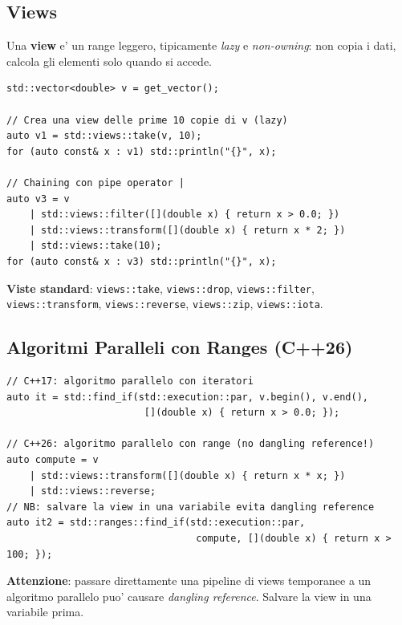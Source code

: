 \documentclass[11pt,a4paper]{article}
\theoremstyle{remark}
\begin{document}
\subsection{Views}

Una \textbf{view} e' un range leggero, tipicamente \emph{lazy} e \emph{non-owning}: non copia i dati, calcola gli elementi solo quando si accede.

\begin{lstlisting}[style=cpp]
std::vector<double> v = get_vector();

// Crea una view delle prime 10 copie di v (lazy)
auto v1 = std::views::take(v, 10);
for (auto const& x : v1) std::println("{}", x);

// Chaining con pipe operator |
auto v3 = v
    | std::views::filter([](double x) { return x > 0.0; })
    | std::views::transform([](double x) { return x * 2; })
    | std::views::take(10);
for (auto const& x : v3) std::println("{}", x);
\end{lstlisting}

\textbf{Viste standard}: \lstinline|views::take|, \lstinline|views::drop|, \lstinline|views::filter|, \lstinline|views::transform|, \lstinline|views::reverse|, \lstinline|views::zip|, \lstinline|views::iota|.

\subsection{Algoritmi Paralleli con Ranges (C++26)}

\begin{lstlisting}[style=cpp]
// C++17: algoritmo parallelo con iteratori
auto it = std::find_if(std::execution::par, v.begin(), v.end(),
                        [](double x) { return x > 0.0; });

// C++26: algoritmo parallelo con range (no dangling reference!)
auto compute = v
    | std::views::transform([](double x) { return x * x; })
    | std::views::reverse;
// NB: salvare la view in una variabile evita dangling reference
auto it2 = std::ranges::find_if(std::execution::par,
                                 compute, [](double x) { return x > 100; });
\end{lstlisting}

\textbf{Attenzione}: passare direttamente una pipeline di views temporanee a un algoritmo parallelo puo' causare \emph{dangling reference}. Salvare la view in una variabile prima.
\end{document}
